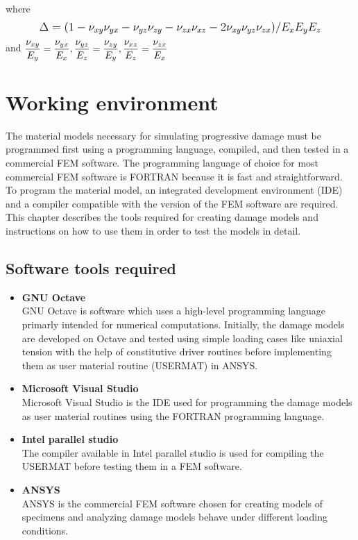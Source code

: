\documentclass[12pt,a4paper,twoside,openright]{report}
\begin{document}
 where 
 \begin{align*}
\mathlarger{ \Delta = (1 - \nu_{xy}\nu_{yx} - \nu_{yz}\nu_{zy} - \nu_{zx}\nu_{xz} - 2\nu_{xy}\nu_{yz}\nu_{zx})/E_{x}E_{y}E_{z}}
 \end{align*}
   and  $\mathlarger{\frac{\nu_{xy}}{E_{y}} = \frac{\nu_{yx}}{E_{x}}, \frac{\nu_{yz}}{E_{z}} = \frac{\nu_{zy}}{E_{y}}, \frac{\nu_{xz}}{E_{z}} = \frac{\nu_{zx}}{E_{x}} }$ 


\newpage
\vspace*{3cm}
\chapter{Working environment}
\vspace*{1cm}
\indent\indent\indent  The material models necessary for simulating progressive damage must be programmed first using a programming language, compiled, and then tested in a commercial FEM software. The programming language of choice for most commercial FEM software is FORTRAN because it is fast and straightforward. To program the material model, an integrated development environment (IDE) and a compiler compatible with the version of the FEM software are required. This chapter describes the tools required for creating damage models and instructions on how to use them in order to test the models in detail.   
\vspace*{1cm}
\section{Software tools required}
\begin{itemize}
\item \textbf{GNU Octave}\\ \indent
\hspace*{13mm} GNU Octave is software which uses a high-level programming language primarly intended for numerical computations. Initially, the damage models are developed on Octave and tested using simple loading cases like uniaxial tension with the help of constitutive driver routines before implementing them as user material routine (USERMAT) in ANSYS. 
\item \textbf{Microsoft Visual Studio }\\
\hspace*{13mm} Microsoft Visual Studio is the IDE used for programming the damage models as user material routines using the FORTRAN programming language.
\item \textbf{Intel parallel studio}\\
\hspace*{13mm} The compiler available in Intel parallel studio is used for compiling the USERMAT before testing them in a FEM software.
\item \textbf{ANSYS }\\
\hspace*{13mm}ANSYS is the commercial FEM software chosen for creating models of specimens and analyzing damage models behave under different loading conditions.
\end{itemize}
\end{document}

